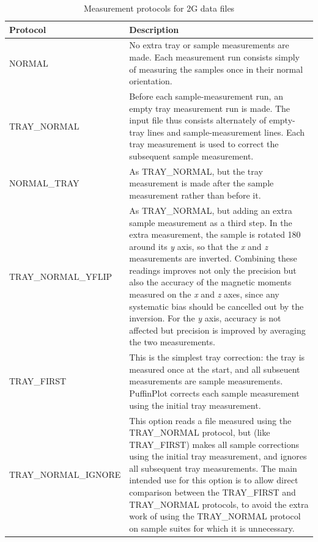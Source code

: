 \documentclass[a4paper,british]{article}
\newcommand{\caps}[1]{\MakeTextUppercase{#1}} %
\begin{document}
\begin{table}
  \caption{\label{tbl:import-protocols}Measurement protocols for 2\caps{g} data files}

\begin{tabular}{lp{90mm}} \toprule
Protocol & Description \\ \midrule
\caps{normal} &
 No extra tray or sample measurements are made. Each measurement run
 consists simply of measuring the samples once in their normal
 orientation. \\
\caps{tray\_normal} &
 Before each sample-measurement run, an empty tray measurement run
 is made. The input file thus consists alternately of empty-tray
 lines and sample-measurement lines. Each tray measurement is used
 to correct the subsequent sample measurement.
 \\
\caps{normal\_tray} &
 As \caps{tray\_normal}, but the tray measurement is made after
 the sample measurement rather than before it.\\
\caps{tray\_normal\_yflip} &
 As \caps{tray\_normal}, but adding an extra sample measurement as
 a third step. In the extra measurement, the sample is rotated
180\textdegree{} around its {\em y} axis, so that the {\em x} and {\em z}
measurements are inverted. Combining these readings improves not only the
precision but also the accuracy of the magnetic moments measured on the {\em
  x} and {\em z} axes, since any systematic bias should be cancelled out by
the inversion. For the {\em y} axis, accuracy is not affected but
precision is improved by averaging the two measurements. \\
\caps{tray\_first} &
 This is the simplest tray correction: the tray is measured once at the
start, and all subseuent measurements are sample measurements. PuffinPlot
corrects each sample measurement using the initial tray measurement.
\\
\caps{tray\_normal\_ignore} &
This option reads a file measured using the \caps{tray\_normal} protocol, but
(like \caps{tray\_first}) makes all sample corrections using the initial tray
measurement, and ignores all subsequent tray measurements. The main intended
use for this option is to allow direct comparison between the
\caps{tray\_first} and \caps{tray\_normal} protocols, to avoid the extra
work of using the \caps{tray\_normal} protocol on sample suites for which it
is unnecessary. \\ \bottomrule
\end{tabular}
\end{table}
\end{document}
